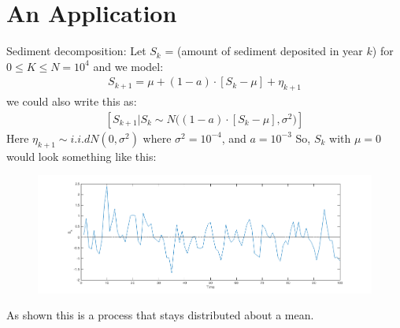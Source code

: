 \documentclass[../../../Master/AppliedStochastics.tex]{subfiles}
\author{Chandler}  %
\date{October 5}    %
\begin{document}
%


\makelecture %


\section{An Application}
Sediment decomposition: 
Let $S_{k}$ = (amount of sediment deposited in year $k$) for $0\leq K \leq N=10^4$ 
and we model: 
$$\begin{aligned}
	S_{k+1} = \mu + (1-a) \cdot [S_{k}-\mu] + \eta_{k+1}
\end{aligned}$$
we could also write this as: 
$$\begin{aligned}
[S_{k+1}\vert S_{k} \sim N\big((1-a) \cdot [S_{k}-\mu], \sigma^2\big)]
\end{aligned}$$
Here $\eta_{k+1} \sim i.i.d N(0, \sigma^{2})$ where $\sigma^{2} = 10^{-4}$, and $a=10^{-3}$
So, $S_{k}$ with $\mu=0$ would look something like this: 
\begin{figure}[H]
	\centering
	\includegraphics[width=0.7\linewidth]{process}
	\caption*{}
	\label{fig:process}
\end{figure}
As shown this is a process that stays distributed about a mean. 
\end{document}
